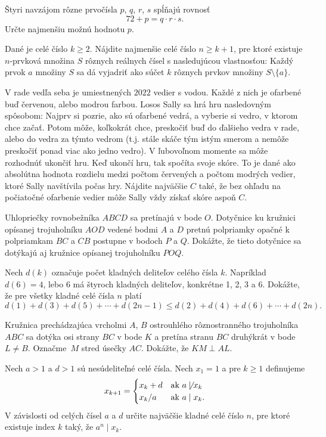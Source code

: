 {%
Štyri navzájom rôzne prvočísla $p$, $q$, $r$, $s$ spĺňajú rovnosť
$$72+p=q\cdot r\cdot s. $$
Určte najmenšiu možnú hodnotu $p$.
}

{%
Dané je celé číslo $k\ge 2$. Nájdite najmenšie celé číslo $n\ge k+1$, pre ktoré existuje $n$-prvková množina $S$ rôznych reálnych čísel s nasledujúcou vlastnosťou: Každý prvok $a$ množiny $S$ sa dá vyjadriť ako súčet $k$ rôznych prvkov množiny $S \setminus \{a\}$.
}

{%
V rade vedľa seba je umiestnených $2022$ vedier s vodou. Každé z nich je ofarbené buď červenou, alebo modrou farbou. Losos Sally sa hrá hru nasledovným spôsobom:
\smallskip
Najprv si pozrie, ako sú ofarbené vedrá, a vyberie si vedro, v ktorom chce začať. Potom môže, koľkokrát chce, preskočiť buď do ďalšieho vedra v rade, alebo do vedra za týmto vedrom (t.j. stále skáče tým istým smerom a nemôže preskočiť ponad viac ako jedno vedro). V ľubovoľnom momente sa môže rozhodnúť ukončiť hru.
\smallskip
Keď ukončí hru, tak spočíta svoje skóre. To je dané ako absolútna hodnota rozdielu medzi počtom červených a počtom modrých vedier,  ktoré Sally navštívila počas hry.
\smallskip
Nájdite najväčšie $C$ také, že bez ohľadu na počiatočné ofarbenie vedier môže Sally vždy získať skóre aspoň $C$.}

{%
Uhlopriečky rovnobežníka $ABCD$ sa pretínajú v bode $O$. Dotyčnice ku kružnici opísanej trojuholníku $AOD$ vedené bodmi $A$ a $D$ pretnú polpriamky opačné k polpriamkam $BC$ a $CB$ postupne v bodoch $P$ a $Q$. Dokážte, že tieto dotyčnice sa dotýkajú aj kružnice opísanej trojuholníku $POQ$.}

{%
Nech $d(k)$ označuje počet kladných deliteľov celého čísla $k$. Napríklad $d(6)=4$, lebo 6 má štyroch kladných deliteľov, konkrétne 1, 2, 3 a 6. Dokážte, že pre všetky kladné celé čísla $n$ platí
$$d(1)+d(3)+d(5)+\cdots+d(2n-1)\le d(2)+d(4)+d(6)+\cdots+d(2n).$$}
\podpis{}

{%
Kružnica prechádzajúca vrcholmi $A$, $B$ ostrouhlého rôznostranného trojuholníka $ABC$ sa dotýka osi strany $BC$ v bode $K$ a pretína stranu $BC$ druhýkrát v bode $L\ne B$. Označme~$M$ stred úsečky $AC$. Dokážte, že $KM\perp AL$.}

{%
Nech $a>1$ a $d>1$ sú nesúdeliteľné celé čísla. Nech $x_1=1$ a pre $k\ge 1$ definujeme
$$
x_{k+1}=
\begin{cases}
        x_k+d & \text{ak }a\not\mid x_k\cr
        x_k/a & \text{ak }a\mid x_k.\cr
\end{cases}
$$
V závislosti od celých čísel $a$ a $d$ určite najväčšie kladné celé číslo $n$, pre ktoré existuje index $k$ taký, že $a^n\mid x_k$. }


